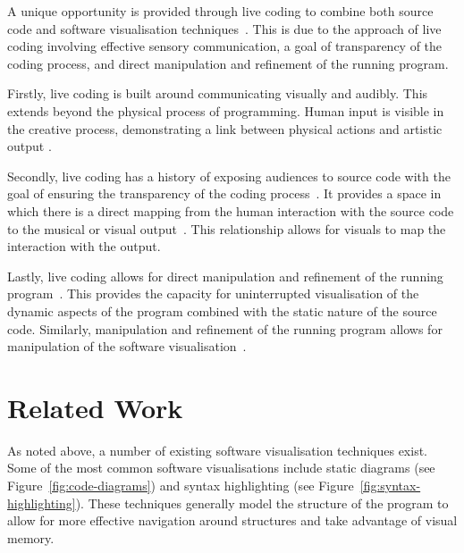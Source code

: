 A unique opportunity is provided through live coding to combine both source code and software visualisation techniques~\cite{McLean2010a}. This is due to the approach of live coding involving effective sensory communication, a goal of transparency of the coding process, and direct manipulation and refinement of the running program.

Firstly, live coding is built around communicating visually and audibly. This extends beyond the physical process of programming. Human input is visible in the creative process, demonstrating a link between physical actions and artistic output \cite{Mclean}.

Secondly, live coding has a history of exposing audiences to source code with the goal of ensuring the transparency of the coding process~\cite{Collins2011,McLean2010a}. It provides a space in which there is a direct mapping from the human interaction with the source code to the musical or visual output~\cite{Mclean}. This relationship allows for visuals to map the interaction with the output.

Lastly, live coding allows for direct manipulation and refinement of the running program~\cite{Swift2013}. This provides the capacity for uninterrupted visualisation of the dynamic aspects of the program combined with the static nature of the source code. Similarly, manipulation and refinement of the running program allows for manipulation of the software visualisation~\cite{McLean2010a}.



\section{Related Work}


  

As noted above, a number of existing software visualisation techniques exist. Some of the most common software visualisations include static diagrams (see Figure~\ref{fig:code-diagrams}) and syntax highlighting (see Figure~\ref{fig:syntax-highlighting}). These techniques generally model the structure of the program to allow for more effective navigation around structures and take advantage of visual memory.

